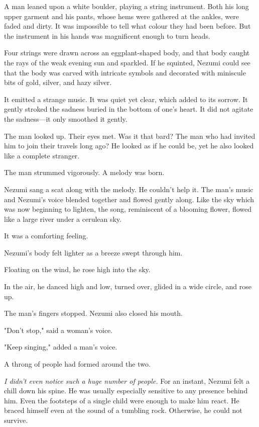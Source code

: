 A man leaned upon a white boulder, playing a string instrument. Both his
long upper garment and his pants, whose hems were gathered at the
ankles, were faded and dirty. It was impossible to tell what colour they
had been before. But the instrument in his hands was magnificent enough
to turn heads.

Four strings were drawn across an eggplant-shaped body, and that body
caught the rays of the weak evening sun and sparkled. If he squinted,
Nezumi could see that the body was carved with intricate symbols and
decorated with miniscule bits of gold, silver, and hazy silver.

It emitted a strange music. It was quiet yet clear, which added to its
sorrow. It gently stroked the sadness buried in the bottom of one's
heart. It did not agitate the sadness---it only smoothed it gently.

The man looked up. Their eyes met. Was it that bard? The man who had
invited him to join their travels long ago? He looked as if he could be,
yet he also looked like a complete stranger.

The man strummed vigorously. A melody was born.

Nezumi sang a scat along with the melody. He couldn't help it. The man's
music and Nezumi's voice blended together and flowed gently along. Like
the sky which was now beginning to lighten, the song, reminiscent of a
blooming flower, flowed like a large river under a cerulean sky.

It was a comforting feeling.

Nezumi's body felt lighter as a breeze swept through him.~

Floating on the wind, he rose high into the sky.

In the air, he danced high and low, turned over, glided in a wide
circle, and rose up.

The man's fingers stopped. Nezumi also closed his mouth.

"Don't stop," said a woman's voice.

"Keep singing," added a man's voice.

A throng of people had formed around the two.

\emph{I didn't even notice such a huge number of people.} For an instant,
Nezumi felt a chill down his spine. He was usually especially sensitive
to any presence behind him. Even the footsteps of a single child were
enough to make him react. He braced himself even at the sound of a
tumbling rock. Otherwise, he could not survive.

